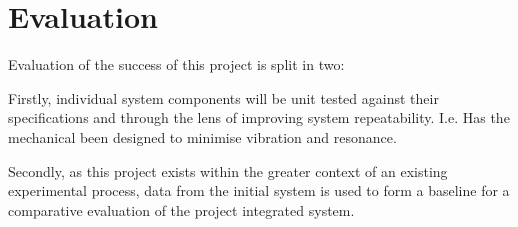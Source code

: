 \section{Evaluation}
Evaluation of the success of this project is split in two:

Firstly, individual system components will be unit tested against their specifications and through the lens of improving system repeatability. I.e. Has the mechanical been designed to minimise vibration and resonance.

Secondly, as this project exists within the greater context of an existing experimental process, data from the initial system is used to form a baseline for a comparative evaluation of the project integrated system.    